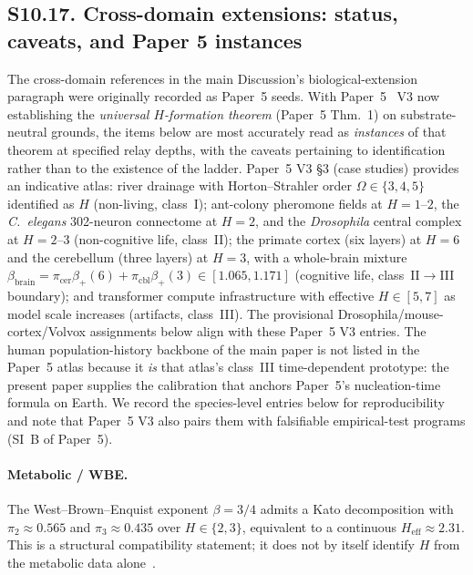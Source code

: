 \documentclass[11pt]{article}
\begin{document}
\subsection*{S10.17. Cross-domain extensions: status, caveats, and Paper 5 instances}
\label{subsec:S10_17_cross_domain}
The cross-domain references in the main Discussion's biological-extension paragraph were originally recorded as Paper~5 seeds.  With Paper~5~\cite{Kato2026e} V3 now establishing the \emph{universal $H$-formation theorem} (Paper~5 Thm.~1) on substrate-neutral grounds, the items below are most accurately read as \emph{instances} of that theorem at specified relay depths, with the caveats pertaining to identification rather than to the existence of the ladder.  Paper~5 V3 \S3 (case studies) provides an indicative atlas: river drainage with Horton--Strahler order $\Omega\in\{3,4,5\}$ identified as $H$ (non-living, class~I); ant-colony pheromone fields at $H{=}1$--$2$, the \emph{C.~elegans} 302-neuron connectome at $H{=}2$, and the \emph{Drosophila} central complex at $H{=}2$--$3$ (non-cognitive life, class~II); the primate cortex (six layers) at $H{=}6$ and the cerebellum (three layers) at $H{=}3$, with a whole-brain mixture $\beta_{\mathrm{brain}}=\pi_{\mathrm{cer}}\beta_+(6)+\pi_{\mathrm{cbl}}\beta_+(3)\in[1.065,1.171]$ (cognitive life, class~II$\to$III boundary); and transformer compute infrastructure with effective $H{\in}[5,7]$ as model scale increases (artifacts, class~III).  The provisional Drosophila/mouse-cortex/Volvox assignments below align with these Paper~5 V3 entries.  The human population-history backbone of the main paper is not listed in the Paper~5 atlas because it \emph{is} that atlas's class~III time-dependent prototype: the present paper supplies the calibration that anchors Paper~5's nucleation-time formula on Earth.  We record the species-level entries below for reproducibility and note that Paper~5 V3 also pairs them with falsifiable empirical-test programs (SI~B of Paper~5).

\paragraph{Metabolic / WBE.}
The West--Brown--Enquist exponent $\beta{=}3/4$ admits a Kato decomposition with $\pi_2{\approx}0.565$ and $\pi_3{\approx}0.435$ over $H{\in}\{2,3\}$, equivalent to a continuous $H_{\mathrm{eff}}{\approx}2.31$.  This is a structural compatibility statement; it does not by itself identify $H$ from the metabolic data alone~\cite{Kato2026d}.
\end{document}
